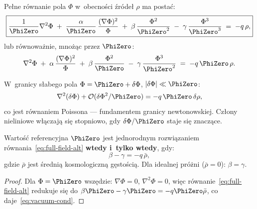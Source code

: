 \begin{theorem}\label{thm:field-eq}
Pe\l{}ne r\'ownanie pola $\Phi$ w~obecno\'sci \'zr\'ode\l{} $\rho$ ma posta\'c:
\begin{equation}\label{eq:full-field}
  \boxed{
    \frac{1}{\PhiZero}\nabla^2\Phi
    \;+\;
    \frac{\alpha}{\PhiZero}\,\frac{(\nabla\Phi)^2}{\Phi}
    \;+\;
    \beta\,\frac{\Phi^2}{\PhiZero^2}
    \;-\;
    \gamma\,\frac{\Phi^3}{\PhiZero^3}
    \;=\;
    -q\,\rho,
  }
\end{equation}
lub r\'ownowa\.znie, mno\.z\k{a}c przez $\PhiZero$:
\begin{equation}\label{eq:full-field-alt}
    \nabla^2\Phi
    \;+\;
    \alpha\,\frac{(\nabla\Phi)^2}{\Phi}
    \;+\;
    \beta\,\frac{\Phi^2}{\PhiZero}
    \;-\;
    \gamma\,\frac{\Phi^3}{\PhiZero^2}
    \;=\;
    -q\,\PhiZero\,\rho.
  \end{equation}
\end{theorem}

\begin{remark}[Hierarchia cz\l{}on\'ow]
W~granicy s\l{}abego pola $\Phi = \PhiZero + \delta\Phi$,
$|\delta\Phi| \ll \PhiZero$:
\begin{equation}
    \nabla^2(\delta\Phi) + \mathcal{O}(\delta\Phi^2/\PhiZero)
    = -q\,\PhiZero\,\delta\rho,
\end{equation}
co jest r\'ownaniem Poissona --- fundamentem granicy newtonowskiej.
Cz\l{}ony nieliniowe w\l{}\k{a}czaj\k{a} si\k{e} stopniowo, gdy
$\delta\Phi/\PhiZero$ staje si\k{e} znacz\k{a}ce.
\end{remark}

\begin{proposition}\label{prop:vacuum-condition}\label{ssec:warunek-prozniowy}
Warto\'s\'c referencyjna $\PhiZero$ jest jednorodnym
rozwi\k{a}zaniem r\'ownania~\eqref{eq:full-field-alt}
\textbf{wtedy i~tylko wtedy}, gdy:
\begin{equation}\label{eq:vacuum-cond}
  \beta - \gamma = -q\,\bar{\rho},
\end{equation}
gdzie $\bar{\rho}$ jest \'sredni\k{a} kosmologiczn\k{a}
g\k{e}sto\'sci\k{a}. Dla idealnej pr\'o\.zni ($\bar{\rho} = 0$):
$\beta = \gamma$.
\end{proposition}

\begin{proof}
Dla $\Phi = \PhiZero$ wsz\k{e}dzie: $\nabla\Phi = 0$,
$\nabla^2\Phi = 0$, wi\k{e}c r\'ownanie~\eqref{eq:full-field-alt}
redukuje si\k{e} do $\beta\PhiZero - \gamma\PhiZero = -q\PhiZero\bar\rho$,
co daje~\eqref{eq:vacuum-cond}.
\end{proof}

